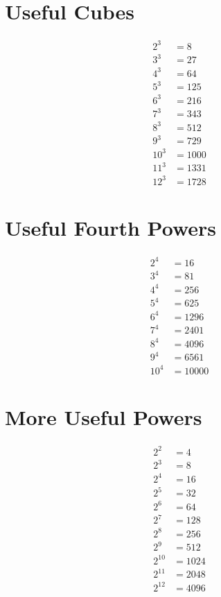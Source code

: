\documentclass[12pt]{article}
\begin{document}
\newpage
\section*{Useful Cubes}
\begin{align*}
 2^3  & = 8\\
 3^3  & = 27\\
 4^3  & = 64\\
 5^3  & = 125\\
 6^3  & = 216\\
 7^3  & = 343\\
 8^3  & = 512\\
 9^3  & = 729\\
10^3 & = 1000\\
11^3 & = 1331\\
12^3 & = 1728
\end{align*}

\section*{Useful Fourth Powers}
\begin{align*}
2^4  & = 16\\
3^4  & = 81\\
4^4  & = 256\\
5^4  & = 625\\
6^4  & = 1296\\
7^4  & = 2401\\
8^4  & = 4096\\
9^4  & = 6561\\
10^4 & = 10000
\end{align*}

\section*{More Useful Powers}
\begin{align*}
2^2    & = 4\\
2^3    & = 8\\
2^4    & = 16\\
2^5    & = 32\\
2^6    & = 64\\
2^7    & = 128\\
2^8    & = 256\\
2^9    & = 512\\
2^{10} & = 1024\\
2^{11} & = 2048\\
2^{12} & = 4096\\
\end{align*}
\end{document}
